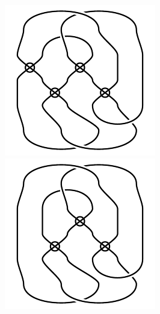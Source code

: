 \begin{figure}[H]
\begin{minipage}[b]{.18\linewidth}
\end{minipage}
\begin{minipage}[b]{.18\linewidth}
\centering
\includegraphics[width=\linewidth]{../data/virtual_4_9.png}
\end{minipage}
\begin{minipage}[b]{.18\linewidth}
\centering
\includegraphics[width=\linewidth]{../data/virtual_4_10.png}

\end{minipage}
\end{figure}

